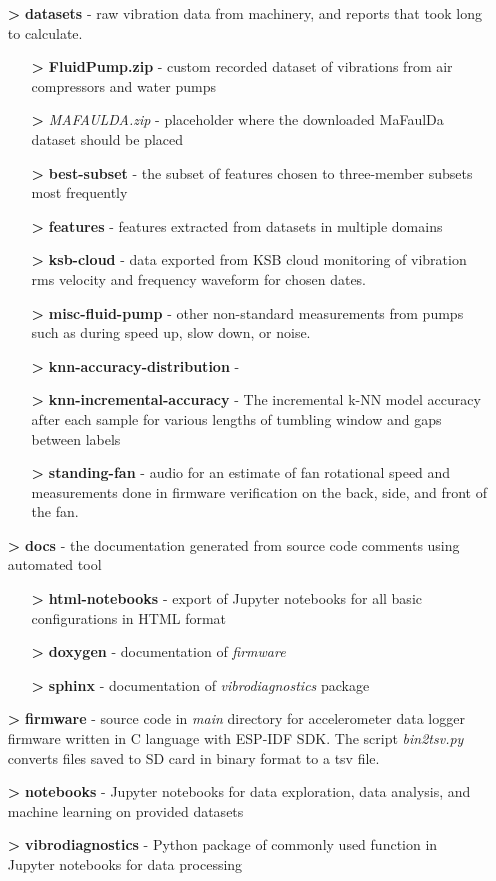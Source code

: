 \begin{itemize}[noitemsep]
\item[\textbf{>}] \textbf{datasets} - raw vibration data from machinery, and reports that took long to calculate.
	\begin{itemize}[noitemsep]
	\item[\textbf{>}] \textbf{FluidPump.zip} - custom recorded dataset of vibrations from air compressors and water pumps
	\item[\textbf{>}] \emph{MAFAULDA.zip} - placeholder where the downloaded MaFaulDa dataset should be placed
	\item[\textbf{>}] \textbf{best-subset} - the subset of features chosen to three-member subsets most frequently
	\item[\textbf{>}] \textbf{features} - features extracted from datasets in multiple domains
	\item[\textbf{>}] \textbf{ksb-cloud} - data exported from KSB cloud monitoring of vibration rms velocity and frequency waveform for chosen dates.
	\item[\textbf{>}] \textbf{misc-fluid-pump} - other non-standard measurements from pumps such as during speed up, slow down, or noise.
	\item[\textbf{>}] \textbf{knn-accuracy-distribution} - 
	\item[\textbf{>}] \textbf{knn-incremental-accuracy} - The incremental k-NN model accuracy after each sample for various lengths of tumbling window and gaps between labels 
	\item[\textbf{>}] \textbf{standing-fan} - audio for an estimate of fan rotational speed and measurements done in firmware verification on the back, side, and front of the fan.
	\end{itemize}
\item[\textbf{>}] \textbf{docs} - the documentation generated from source code comments  using automated tool
	\begin{itemize}[noitemsep]
	\item[\textbf{>}] \textbf{html-notebooks} - export of Jupyter notebooks for all basic configurations in HTML format
	\item[\textbf{>}] \textbf{doxygen} - documentation of \emph{firmware} 
	\item[\textbf{>}] \textbf{sphinx} - documentation of \emph{vibrodiagnostics} package
	\end{itemize}
\item[\textbf{>}] \textbf{firmware} - source code in \emph{main} directory for accelerometer data logger firmware written in C language with ESP-IDF SDK. The script \emph{bin2tsv.py} converts files saved to SD card in binary format to a tsv file.
\item[\textbf{>}] \textbf{notebooks} - Jupyter notebooks for data exploration, data analysis, and machine learning on provided datasets
\item[\textbf{>}] \textbf{vibrodiagnostics} - Python package of commonly used function in Jupyter notebooks for data processing
\end{itemize}